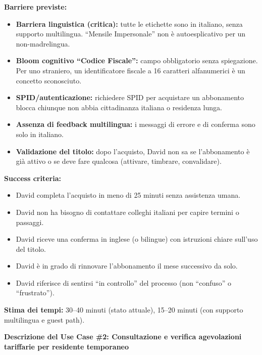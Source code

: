 \documentclass[11pt,a4paper]{article}
\begin{document}
\begin{tcolorbox}[colback=backgroundColor,colframe=borderColor,arc=2mm]
{    \textbf{Barriere previste:}
    \begin{itemize}
        \item \textbf{Barriera linguistica (critica):} tutte le etichette sono in italiano, senza supporto multilingua. ``Mensile Impersonale'' non \`e autoesplicativo per un non-madrelingua.
        \item \textbf{Bloom cognitivo ``Codice Fiscale'':} campo obbligatorio senza spiegazione. Per uno straniero, un identificatore fiscale a 16 caratteri alfanumerici \`e un concetto sconosciuto.
        \item \textbf{SPID/autenticazione:} richiedere SPID per acquistare un abbonamento blocca chiunque non abbia cittadinanza italiana o residenza lunga.
        \item \textbf{Assenza di feedback multilingua:} i messaggi di errore e di conferma sono solo in italiano.
        \item \textbf{Validazione del titolo:} dopo l'acquisto, David non sa se l'abbonamento \`e gi\`a attivo o se deve fare qualcosa (attivare, timbrare, convalidare).
    \end{itemize}

    \textbf{Success criteria:}
    \begin{itemize}
        \item David completa l'acquisto in meno di 25 minuti senza assistenza umana.
        \item David non ha bisogno di contattare colleghi italiani per capire termini o passaggi.
        \item David riceve una conferma in inglese (o bilingue) con istruzioni chiare sull'uso del titolo.
        \item David \`e in grado di rinnovare l'abbonamento il mese successivo da solo.
        \item David riferisce di sentirsi ``in controllo'' del processo (non ``confuso'' o ``frustrato'').
    \end{itemize}

    \textbf{Stima dei tempi:} 30--40 minuti (stato attuale), 15--20 minuti (con supporto multilingua e guest path).
    }
\end{tcolorbox}

\newpage


\begin{tcolorbox}[colback=primaryColor!10,colframe=primaryColor,arc=2mm]
    \textbf{Descrizione del Use Case \#2: Consultazione e verifica agevolazioni tariffarie per residente temporaneo}
\end{tcolorbox}
\end{document}
